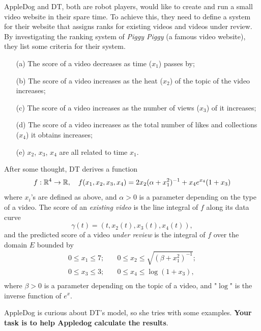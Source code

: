 \documentclass[12pt]{article}
\renewcommand{\emph}[1]{{\color{Turquoise3}\textsl{#1}}}
\begin{document}
AppleDog and DT, both are robot players, would like to create and run a small video website in their spare time. To achieve this, they need to define a system for their website that assigns ranks for existing videos and videos under review. By investigating the ranking system of \textsl{Piggy Piggy} (a famous video website), they list some criteria for their system.
\begin{itemize}
    \item[(a)] The score of a video decreases as time (\emph{$x_1$}) passes by;
    \item[(b)] The score of a video increases as the heat (\emph{$x_2$}) of the topic of the video increases;
    \item[(c)] The score of a video increases as the number of views (\emph{$x_3$}) of it increases;
    \item[(d)] The score of a video increases as the total number of likes and collections (\emph{$x_4$}) it obtains increases;
    \item[(e)] $x_2$, $x_3$, $x_4$ are all related to time \emph{$x_1$}. 
\end{itemize}
\par After some thought, DT derives a function 
\begin{equation*}
    f:\mathbb{R}^4 \to \mathbb{R},\quad f(x_1, x_2, x_3, x_4) = 2 x_2(\alpha + x_1^2)^{-1} + x_4e^{x_4}(1 + x_3)
\end{equation*}
where $x_i$'s are defined as above, and $\alpha > 0$ is a parameter depending on the type of a video. The score of an \textsl{existing video} is the line integral of $f$ along its data curve
\begin{equation*}
    \gamma(t)=(t,x_2(t),x_3(t),x_4(t)), 
\end{equation*}
and the predicted score of a video \textsl{under review} is the integral of $f$ over the domain $E$ bounded by
\begin{equation*}
    \begin{split}
        0 \leq x_1\leq 7;& \quad 0 \leq x_2 \leq \sqrt{(\beta + x_1^2)^{-1}};\\
        0 \leq x_3 \leq 3;& \quad 0 \leq x_4 \leq \log(1 + x_3),\\ 
    \end{split}
\end{equation*}
where $\beta > 0$ is a parameter depending on the topic of a video, and "$\log$" is the inverse function of $e^x$.
\par AppleDog is curious about DT's model, so she tries with some examples. \textbf{Your task is to help Appledog calculate the results}. 
\end{document}
